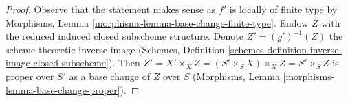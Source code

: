 \documentclass[10pt,a4paper]{amsart}
\theoremstyle{plain}
\theoremstyle{definition}
\theoremstyle{remark}
\numberwithin{equation}{subsection}
\begin{document}
\begin{proof}
Observe that the statement makes sense as $f'$ is locally of
finite type by Morphisms, Lemma \ref{morphisms-lemma-base-change-finite-type}.
Endow $Z$ with the reduced induced closed subscheme structure.
Denote $Z' = (g')^{-1}(Z)$ the scheme theoretic inverse image
(Schemes, Definition \ref{schemes-definition-inverse-image-closed-subscheme}).
Then $Z' = X' \times_X Z = (S' \times_S X) \times_X Z = S' \times_S Z$
is proper over $S'$ as a base change of $Z$ over $S$
(Morphisms, Lemma \ref{morphisms-lemma-base-change-proper}).
\end{proof}
\end{document}
